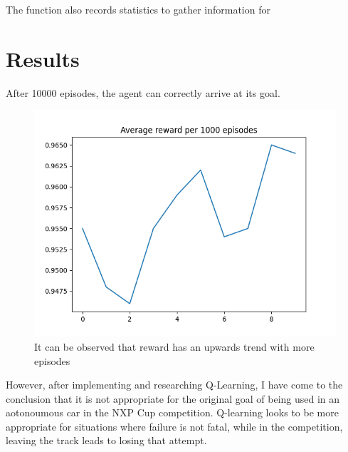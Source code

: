 \documentclass[12pt]{article}
\begin{document}
The function also records statistics to gather information for

\section{Results}

After 10000 episodes, the agent can correctly arrive at its goal.

\begin{figure}[H]
  \includegraphics[width=\linewidth]{results}
  \caption{It can be observed that reward has an upwards trend with more episodes\protect\footnotemark}
  \centering
\end{figure}


However, after implementing and researching Q-Learning, I have come to the conclusion that it is not appropriate
for the original goal of being used in an aotonoumous car in the NXP Cup competition. Q-learning looks to be more
appropriate for situations where failure is not fatal, while in the competition, leaving the track leads to losing
that attempt.

\newpage



\end{document}
